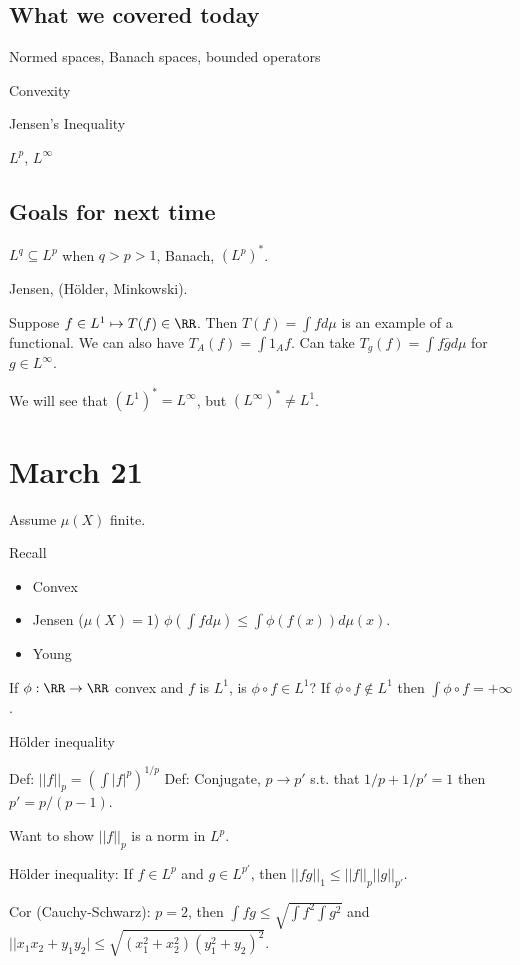 \documentclass{../uva7310}
\begin{document}
\subsection{What we covered today}

Normed spaces, Banach spaces, bounded operators

Convexity

Jensen's Inequality

\(L^p\), \(L^\infty \)

\subsection{Goals for next time}

\(L^q\subseteq L^p\) when \(q>p>1\), Banach, \((L^p)^*\).

Jensen, (H\"older, Minkowski).

Suppose \(f\in L^1\mapsto T(f)\in\RR \). Then \(T(f)=\int f d\mu \) is an example of a functional. We can also have
\(T_A(f)=\int 1_A f\). Can take \(T_g(f)=\int f\bar{g} d\mu \) for \(g\in L^\infty \).

We will see that \({(L^1)}^*=L^\infty \), but \({(L^\infty)}^*\neq L^1\).

\section{March 21}

Assume $\mu(X)$ finite.

Recall
\begin{itemize}
    \item Convex
    \item Jensen ($\mu(X)=1$) $\phi(\int fd\mu)\leq \int\phi(f(x))d\mu(x)$.
    \item Young
\end{itemize}

If $\phi:\RR\rightarrow\RR$ convex and $f$ is $L^1$, is $\phi\circ f\in L^1$? If $\phi\circ f\notin L^1$ then $\int \phi\circ f=+\infty$.

H\"older inequality

Def: $||f||_p=\left(\int|f|^p\right)^{1/p}$
Def: Conjugate, $p\to p'$ s.t. that $1/p+1/p'=1$ then $p'=p/(p-1)$.

Want to show $||f||_p$ is a norm in $L^p$.

H\"older inequality: If $f\in L^p$ and $g\in L^{p'}$, then $||fg||_1\leq ||f||_p||g||_{p'}$.

Cor (Cauchy-Schwarz): $p=2$, then $\int fg \leq \sqrt{\int f^2\int g^2}$ and $||x_1x_2+y_1y_2|\leq \sqrt{(x_1^2+x_2^2)(y_1^2+y_2)^2}$.
\end{document}
